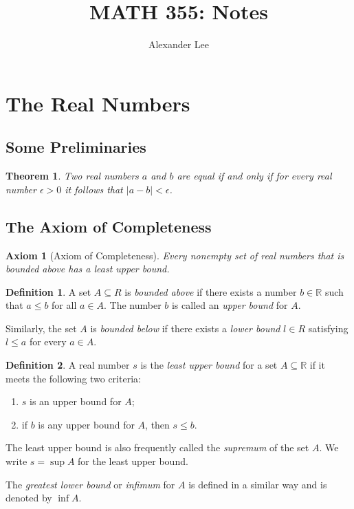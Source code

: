 \documentclass{amsart}
\title{MATH 355: Notes}
\author{Alexander Lee}
\newtheorem*{theorem}{Theorem}
\newtheorem*{axiom}{Axiom}
\theoremstyle{definition}
\newtheorem*{definition}{Definition}
\newcommand{\R}{\mathbb{R}}
\newcommand{\abs}[1]{|#1|}
\begin{document}
\maketitle

\section*{The Real Numbers}

\subsection*{Some Preliminaries}

\begin{theorem}
  Two real numbers $a$ and $b$ are equal if and only if for every real number
  $\epsilon > 0$ it follows that $\abs{a-b} < \epsilon$.
\end{theorem}

\subsection*{The Axiom of Completeness}

\begin{axiom}[Axiom of Completeness]
  Every nonempty set of real numbers that is bounded above has a least upper
  bound.
\end{axiom}

\begin{definition}
  A set $A \subseteq R$ is \emph{bounded above} if there exists a number $b \in
  \R$ such that $a \le b$ for all $a \in A$. The number $b$ is called an
  \emph{upper bound} for $A$.

  Similarly, the set $A$ is \emph{bounded below} if there exists a \emph{lower
  bound} $l \in R$ satisfying $l \le a$ for every $a \in A$.
\end{definition}

\begin{definition}
  A real number $s$ is the \emph{least upper bound} for a set $A \subseteq \R$
  if it meets the following two criteria:
  \begin{enumerate}
    \item $s$ is an upper bound for $A$;
    \item if $b$ is any upper bound for $A$, then $s \le b$.
  \end{enumerate}
  The least upper bound is also frequently called the \emph{supremum} of the set
  $A$. We write $s = \sup{A}$ for the least upper bound.

  The \emph{greatest lower bound} or \emph{infimum} for $A$ is defined in a
  similar way and is denoted by $\inf{A}$.
\end{definition}
\end{document}
